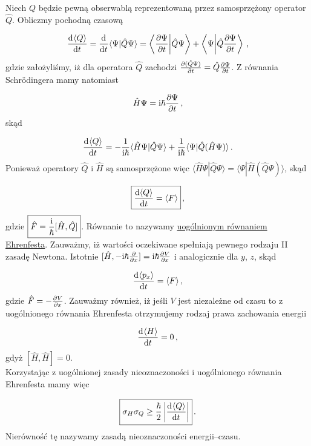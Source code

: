\documentclass{myclass}
\begin{document}
Niech \(Q\) będzie pewną obserwablą reprezentowaną przez samosprzężony operator \(\hat{Q}\).
Obliczmy pochodną czasową

\begin{equation*}
\dv[]{\langle Q\rangle}{t}=\dv[]{}{t}\langle \Psi|\hat{Q}\Psi\rangle=\left\langle \pdv{\Psi}{t}\middle|\hat{Q}\Psi\right\rangle +\left\langle \Psi\middle|\hat{Q}\pdv{\Psi}{t}\right\rangle\,,
\end{equation*}
gdzie założyliśmy, iż dla operatora \(\hat{Q}\) zachodzi
\(\pdv{(\hat{Q}\Psi)}{t}=\hat{Q}\pdv{\Psi}{t}\). Z równania Schr{\"o}dingera mamy natomiast

\begin{equation*}
\hat{H}\Psi=\mathrm{i}\hbar\pdv{\Psi}{t}\,,
\end{equation*}
skąd

\begin{equation*}
\dv[]{\langle Q\rangle}{t}=-\frac{1}{\mathrm{i}\hbar}\langle \hat{H}\Psi|\hat{Q}\Psi\rangle+\frac{1}{\mathrm{i}\hbar}\langle \Psi|\hat{Q}(\hat{H}\Psi)\rangle\,.
\end{equation*}
Ponieważ operatory \(\hat{Q}\) i \(\hat{H}\) są samosprzężone więc \(\langle
\hat{H}\Psi|\hat{Q}\Psi\rangle=\langle \Psi|\hat{H}(\hat{Q}\Psi)\rangle\), skąd

\begin{equation*}
\boxed{\dv{\langle Q\rangle}{t}=\langle F\rangle}\,,
\end{equation*}
gdzie \(\boxed{\hat{F}=\frac{\mathrm{i}}{\hbar}[\hat{H},\hat{Q}]}\). Równanie to nazywamy
\underline{uogólnionym równaniem Ehrenfesta}. Zauważmy, iż wartości oczekiwane spełniają pewnego
rodzaju II zasadę Newtona. Istotnie \([\hat{H},-\mathrm{i}\hbar\pdv{ }{x}]=\mathrm{i}\hbar\pdv{V}{x}\) i
analogicznie dla \(y\), \(z\), skąd

\begin{equation*}
\dv[]{\langle p_x\rangle}{t}=\langle F\rangle\,,
\end{equation*}
gdzie \(\hat{F}=-\pdv{V}{x}\). Zauważmy również, iż jeśli \(V\) jest niezależne od czasu to z
uogólnionego równania Ehrenfesta otrzymujemy rodzaj prawa zachowania energii 

\begin{equation*}
\dv[]{\langle H \rangle}{t}=0\,,
\end{equation*}
gdyż \([\hat{H},\hat{H}]=0\).\\

Korzystając z uogólnionej zasady nieoznaczoności i uogólnionego równania Ehrenfesta mamy więc

\begin{equation*}
\boxed{\sigma_H\sigma_Q\geq\frac{\hbar}{2}\left|\dv[]{\langle Q \rangle}{t}\right|}\,.
\end{equation*}
Nierówność tę nazywamy zasadą nieoznaczoności energii--czasu.
\end{document}
